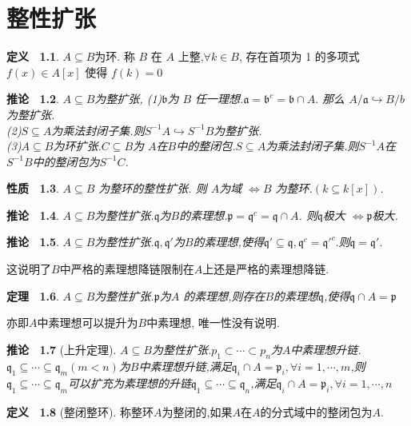 \documentclass[b5paper,oneside]{ctexbook}
\newcommand{\mf}[1]{\mathfrak{#1}}
\theoremstyle{plain}
\newtheorem{thm}{定理~}[chapter]
\newtheorem{prop}[thm]{性质~}
\newtheorem{cor}[thm]{推论~}
\theoremstyle{definition}
\newtheorem{defn}[thm]{定义~}
\begin{document}
\chapter{整性扩张}
\begin{defn} 
$A \subseteq B$为环. 称 $B$ 在 $A$ 上整,$\forall k \in B$, 存在首项为 1 的多项式$f(x) \in A[x]$ 使得 $f(k)=0$
\end{defn} 
\begin{cor}
$A \subseteq B$为整扩张,
(1)$\mathfrak{b} $为 $B$ 任一理想.$\mathfrak{a}=\mathfrak{b}^c= \mathfrak{b}\cap A.$ 那么 $A/\mathfrak{a} \hookrightarrow B/b$ 为整扩张.\\
(2)$S \subseteq A$为乘法封闭子集.则$S^{−1}A \hookrightarrow S^{−1}B$为整扩张.\\
(3)$A \subseteq B$为环扩张.$C \subseteq B$为 $A$在$B$中的整闭包.$S \subseteq A$为乘法封闭子集.则$S^{−1}A$在$S^{−1}B$中的整闭包为$S^{−1}C$.
\end{cor}
\begin{prop}
$A\subseteq B$ 为整环的整性扩张. 则 $A$为域 $\Leftrightarrow B$ 为整环.$(k\subseteq k[x])$.
\end{prop} 
\begin{cor} 
$ A \subseteq B$为整性扩张.$\mathfrak{q}$为$B$的素理想.$\mathfrak{p}=\mathfrak{q}^c=\mathfrak{q}\cap A$. 则$\mathfrak{q}$极大 $\Leftrightarrow\mathfrak{p}$极大.
\end{cor}
\begin{cor}
$ A \subseteq B$为整性扩张.$\mathfrak{q},\mathfrak{q}′$为$B$的素理想,使得$\mathfrak{q}′\subseteq \mathfrak{q},\mathfrak{q}^c=\mathfrak{q}′^c. $则$\mathfrak{q}=\mathfrak{q}′$.
\end{cor}
这说明了$B$中严格的素理想降链限制在$A$上还是严格的素理想降链.
\begin{thm}
$A \subseteq B$为整性扩张.$\mathfrak{p}$为$A$ 的素理想,则存在$B$的素理想$\mathfrak{q}$,使得$ \mathfrak{q}\cap A=\mathfrak{p}$
\end{thm}
亦即$A$中素理想可以提升为$B$中素理想, 唯一性没有说明.
\begin{cor}[上升定理]
 $A\subseteq B$为整性扩张.$p_1 \subset \cdots \subset p_n$为$A$中素理想升链.$\mf{q}_1\subseteq \cdots \subseteq \mf{q}_m(m<n)$为$B$中素理想升链,满足$\mf{q}_i\cap A=\mf{p}_i,\forall i=1,\cdots,m$,则$\mf{q}_1\subseteq\cdots\subseteq \mf{q}_m$可以扩充为素理想的升链$\mf{q}_1\subseteq\cdots\subseteq \mf{q}_n$,满足$\mf{q}_i\cap A=\mf{p}_i,\forall i=1,\cdots,n$
\end{cor} 
\begin{defn}[整闭整环]称整环$A$为整闭的,如果$A$在$A$的分式域中的整闭包为$A$.
\end{defn}
\end{document}
